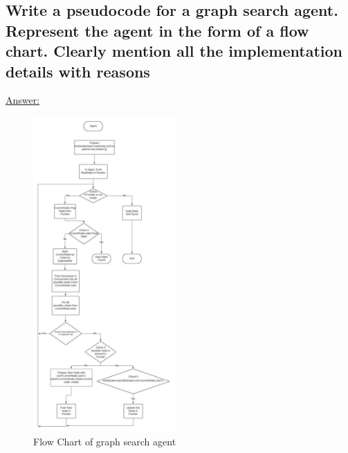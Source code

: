 \documentclass[15pt,journal]{IEEEtran}
\begin{document}
\subsection{Write a pseudocode for a graph search agent. Represent the agent in the form of a flow chart. Clearly mention all the implementation details with reasons}

\underline{Answer:}

\begin{figure}[H]%
\begin {center}
\includegraphics[width=0.48\textwidth]{images/Flowchart.jpeg}
\caption{Flow Chart of graph search agent} %
\label{fig:ecg}
\end {center}
\end{figure}
\end{document}
